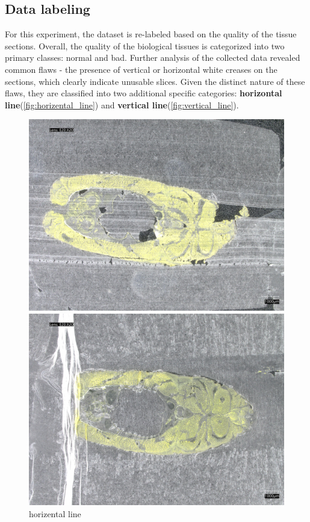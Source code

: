 \subsection{Data labeling}

For this experiment, the dataset is re-labeled based on the quality of the tissue sections. Overall, the quality of the biological tissues is categorized into two primary classes: normal and bad. Further analysis of the collected data revealed common flaws - the presence of vertical or horizontal white creases on the sections, which clearly indicate unusable slices. Given the distinct nature of these flaws, they are classified into two additional specific categories: \textbf{horizontal line}(\autoref{fig:horizental_line}) and \textbf{vertical line}(\autoref{fig:vertical_line}).

\begin{figure}[H]
    \centering
    \begin{minipage}{0.45\textwidth}
        \centering
        \includegraphics[width=\textwidth]{./fig/sample_1/horizental_line.jpg}
        \caption{horizental line}
        \label{fig:horizental_line}
    \end{minipage}
    \begin{minipage}{0.45\textwidth}
        \centering
        \includegraphics[width=\textwidth]{./fig/sample_1/vertical_line.jpg}

\end{minipage}
\end{figure}
